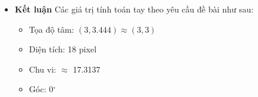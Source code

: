 \begin{itemize}
\begin{equation*}
                         \theta = \dfrac{1}{2} \arctan \left( \dfrac{2 \times 0}{2.67 - 1.358} \right) = 0^{\circ}
                    \end{equation*}
                    \item \textbf{Kết luận}
                    \newline
                    \hspace*{0.6cm}Các giá trị tính toán tay theo yêu cầu đề bài như sau:
                    \begin{itemize}[label={--}]
                         \item Tọa độ tâm: $(3, 3.444) \approx (3, 3)$
                         \item Diện tích: 18 pixel
                         \item Chu vi: $\approx$ 17.3137
                         \item Góc: 0$^{\circ}$
                    \end{itemize}
               \end{itemize}
